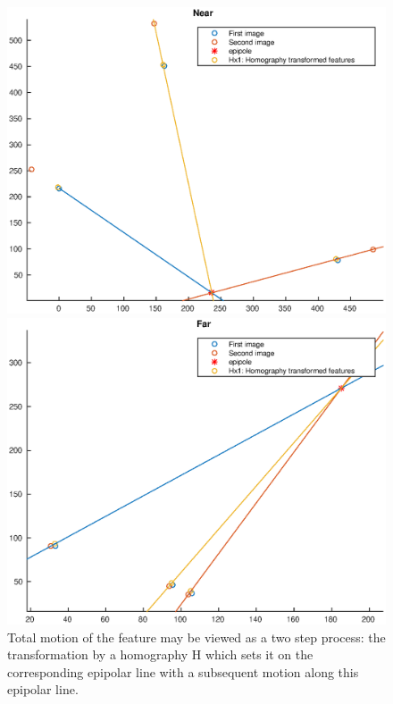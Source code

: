 \documentclass[runningheads]{llncs}
\begin{document}
\begin{figure}
  \label{fig:feature_motion}
  \begin{minipage}[t]{.49\linewidth}
    \centering
    \includegraphics[width=\textwidth]{feature_motion_near}
  \end{minipage}
  \begin{minipage}[t]{.49\linewidth}
    \centering
    \includegraphics[width=\textwidth]{feature_motion_far}
  \end{minipage}
  \caption{Total motion of the feature may be viewed as a two step
    process: the transformation by a homography $\mathrm{H}$ which sets
    it on the corresponding epipolar line with a subsequent motion along
    this epipolar line.}
\end{figure}
\end{document}
